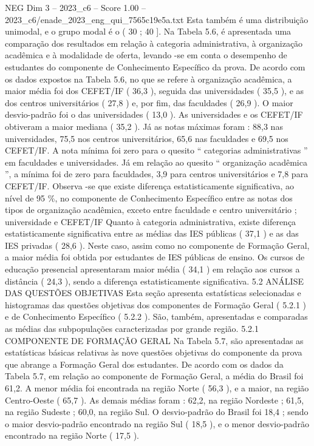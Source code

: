 \begin{textsample}{NEG Dim 3 – 2023\_c6 – Score 1.00 – 2023\_c6/enade\_2023\_eng\_qui\_7565c19e5a.txt}
Esta também é uma distribuição unimodal, e o grupo modal é o ( 30 ; 40 ].
Na Tabela 5.6, é apresentada uma comparação dos resultados em relação à categoria administrativa, à organização acadêmica e à modalidade de oferta, levando -se em conta o desempenho de estudantes do componente de Conhecimento Específico da prova.
De acordo com os dados expostos na Tabela 5.6, no que se refere à organização acadêmica, a maior média foi dos CEFET/IF ( 36,3 ), seguida das universidades ( 35,5 ), e as dos centros universitários ( 27,8 ) e, por fim, das faculdades ( 26,9 ).
O maior desvio-padrão foi o das universidades ( 13,0 ).
As universidades e os CEFET/IF obtiveram a maior mediana ( 35,2 ).
Já as notas máximas foram : 88,3 nas universidades, 75,5 nos centros universitários, 65,6 nas faculdades e 69,5 nos CEFET/IF.
A nota mínima foi zero para o quesito “ categorias administrativas ” em faculdades e universidades.
Já em relação ao quesito “ organização acadêmica ”, a mínima foi de zero para faculdades, 3,9 para centros universitários e 7,8 para CEFET/IF.
Observa -se que existe diferença estatisticamente significativa, ao nível de 95 \%, no componente de Conhecimento Específico entre as notas dos tipos de organização acadêmica, exceto entre faculdade e centro universitário ; universidade e CEFET/IF Quanto à categoria administrativa, existe diferença estatisticamente significativa entre as médias das IES públicas ( 37,1 ) e as das IES privadas ( 28,6 ).
Neste caso, assim como no componente de Formação Geral, a maior média foi obtida por estudantes de IES públicas de ensino.
Os cursos de educação presencial apresentaram maior média ( 34,1 ) em relação aos cursos a distância ( 24,3 ), sendo a diferença estatisticamente significativa. 5.2 ANÁLISE DAS QUESTÕES OBJETIVAS Esta seção apresenta estatísticas selecionadas e histogramas das questões objetivas dos componentes de Formação Geral ( 5.2.1 ) e de Conhecimento Específico ( 5.2.2 ).
São, também, apresentadas e comparadas as médias das subpopulações caracterizadas por grande região. 5.2.1 COMPONENTE DE FORMAÇÃO GERAL Na Tabela 5.7, são apresentadas as estatísticas básicas relativas às nove questões objetivas do componente da prova que abrange a Formação Geral dos estudantes.
De acordo com os dados da Tabela 5.7, em relação ao componente de Formação Geral, a média do Brasil foi 61,2.
A menor média foi encontrada na região Norte ( 56,3 ), e a maior, na região Centro-Oeste ( 65,7 ).
As demais médias foram : 62,2, na região Nordeste ; 61,5, na região Sudeste ; 60,0, na região Sul.
O desvio-padrão do Brasil foi 18,4 ; sendo o maior desvio-padrão encontrado na região Sul ( 18,5 ), e o menor desvio-padrão encontrado na região Norte ( 17,5 ).

\end{textsample}
